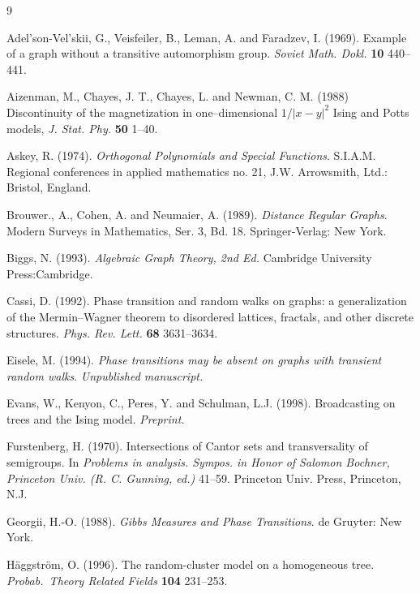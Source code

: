 \begin{thebibliography}{9}

Adel'son-Vel'skii, G., Veisfeiler, B., Leman, A. and Faradzev, I.
(1969).  Example of a graph without a transitive automorphism group.
{\em Soviet Math. Dokl.} {\bf 10} 440--441.

 Aizenman, M., Chayes, J. T., Chayes, L. and Newman, C. M.
(1988) Discontinuity of the magnetization in one--dimensional 
$1/|x-y|^2$ Ising and Potts models, {\em J. Stat. Phy.} {\bf 50} 1--40.

Askey, R. (1974).  {\em Orthogonal Polynomials and Special Functions}.
S.I.A.M. Regional conferences in applied mathematics no. 21,
J.W. Arrowsmith, Ltd.: Bristol, England.

Brouwer., A., Cohen, A. and Neumaier, A. (1989).  {\em Distance Regular 
Graphs}. Modern Surveys in Mathematics, Ser. 3, Bd. 18.  Springer-Verlag: 
New York.

Biggs, N. (1993).  {\em Algebraic Graph Theory, 2nd Ed.}  Cambridge 
University Press:Cambridge.  

 Cassi, D. (1992). 
Phase transition and random walks on graphs: a generalization of the 
Mermin--Wagner theorem to disordered lattices, fractals, and other discrete
structures. {\em Phys. Rev. Lett.} {\bf 68} 3631--3634.

 Eisele, M. (1994).  
{\em Phase transitions may be absent on graphs with transient random walks}.
{\em Unpublished manuscript.}

 Evans, W., Kenyon, C., Peres, Y. and Schulman, L.J.
(1998). Broadcasting on trees and the Ising model. 
{\em Preprint.}

Furstenberg, H. (1970).
Intersections of Cantor sets and transversality of semigroups.
In {\em Problems in analysis. Sympos. in Honor of Salomon Bochner, 
Princeton Univ. (R. C. Gunning, ed.)} 41--59.
Princeton Univ. Press, Princeton, N.J.

 Georgii, H.-O. (1988).
{\em Gibbs Measures and Phase Transitions}. de Gruyter: New York.

 H\"aggstr\"om, O. (1996).  The random-cluster model on a
homogeneous tree. {\em Probab.\ Theory Related Fields} {\bf 104} 231--253.



\end{thebibliography}
